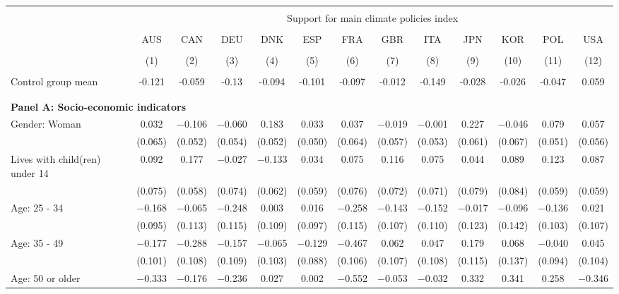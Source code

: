 
\begin{tabular}{@{\extracolsep{5pt}}lcccccccccccc} 
\\[-1.8ex]\hline 
\hline \\[-1.8ex] 
 & \multicolumn{12}{c}{Support for main climate policies index} \\ 
\cline{2-13} 
\\[-1.8ex] & AUS & CAN & DEU & DNK & ESP & FRA & GBR & ITA & JPN & KOR & POL & USA \\ 
\\[-1.8ex] & (1) & (2) & (3) & (4) & (5) & (6) & (7) & (8) & (9) & (10) & (11) & (12)\\ 
\hline \\[-1.8ex] 
Control group mean & -0.121 & -0.059 & -0.13 & -0.094 & -0.101 & -0.097 & -0.012 & -0.149 & -0.028 & -0.026 & -0.047 & 0.059   \\ \hline \\[-1.8ex]
\\[1ex]
\multicolumn{ 13 }{l}{\textbf{ Panel A: Socio-economic indicators }} \\
 Gender: Woman & 0.032 & $-$0.106 & $-$0.060 & 0.183 & 0.033 & 0.037 & $-$0.019 & $-$0.001 & 0.227 & $-$0.046 & 0.079 & 0.057 \\ 
  & (0.065) & (0.052) & (0.054) & (0.052) & (0.050) & (0.064) & (0.057) & (0.053) & (0.061) & (0.067) & (0.051) & (0.056) \\ 
  Lives with child(ren) under 14 & 0.092 & 0.177 & $-$0.027 & $-$0.133 & 0.034 & 0.075 & 0.116 & 0.075 & 0.044 & 0.089 & 0.123 & 0.087 \\ 
  & (0.075) & (0.058) & (0.074) & (0.062) & (0.059) & (0.076) & (0.072) & (0.071) & (0.079) & (0.084) & (0.059) & (0.059) \\ 
  Age: 25 - 34 & $-$0.168 & $-$0.065 & $-$0.248 & 0.003 & 0.016 & $-$0.258 & $-$0.143 & $-$0.152 & $-$0.017 & $-$0.096 & $-$0.136 & 0.021 \\ 
  & (0.095) & (0.113) & (0.115) & (0.109) & (0.097) & (0.115) & (0.107) & (0.110) & (0.123) & (0.142) & (0.103) & (0.107) \\ 
  Age: 35 - 49 & $-$0.177 & $-$0.288 & $-$0.157 & $-$0.065 & $-$0.129 & $-$0.467 & 0.062 & 0.047 & 0.179 & 0.068 & $-$0.040 & 0.045 \\ 
  & (0.101) & (0.108) & (0.109) & (0.103) & (0.088) & (0.106) & (0.107) & (0.108) & (0.115) & (0.137) & (0.094) & (0.104) \\ 
  Age: 50 or older & $-$0.333 & $-$0.176 & $-$0.236 & 0.027 & 0.002 & $-$0.552 & $-$0.053 & $-$0.032 & 0.332 & 0.341 & 0.258 & $-$0.346 \\ 

\end{tabular}
